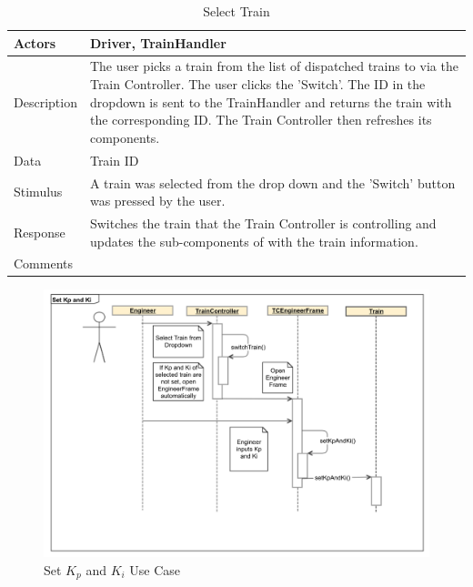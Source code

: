 \documentclass[]{article}
\begin{document}
\begin{table}[H]
	\centering
	\caption{Select Train}
	\begin{tabular}{|l|l|}
		\hline
		Actors & \parbox[t]{10cm}{Driver, TrainHandler} \\ \hline
		Description & \parbox[t]{10cm}{The user picks a train from the list of dispatched trains to via the Train Controller. The user clicks the 'Switch'. The ID in the dropdown is sent to the TrainHandler and returns the train with the corresponding ID. The Train Controller then refreshes its components.} \\ \hline
		Data &  \parbox[t]{10cm}{Train ID} \\ \hline
		Stimulus &  \parbox[t]{10cm}{ A train was selected from the drop down and the 'Switch' button was pressed by the user. } \\ \hline
		Response & \parbox[t]{10cm}{Switches the train that the Train Controller is controlling and updates the sub-components of with the train information.  }\\ \hline
		Comments & \parbox[t]{10cm}{}  \\ \hline
	\end{tabular}
\end{table}


\begin{figure}[H]
	\centering
	\includegraphics[scale=.3]{tc_setKpAndKi_usecase}
	\caption{Set $K_p$ and $K_i$ Use Case}
\end{figure}
\end{document}
